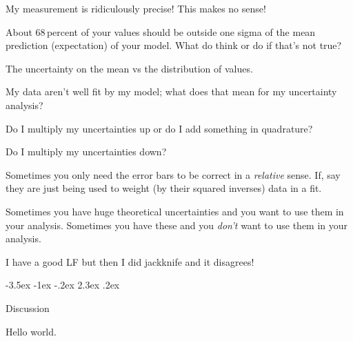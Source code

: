 \documentclass[10pt]{article}
\makeatletter
\renewcommand\section{\@startsection {section}{1}{\z@}%
  {-3.5ex \@plus -1ex \@minus -.2ex}%
  {2.3ex \@plus.2ex}%
  {\raggedright\normalfont\Large\bfseries}}
\makeatother
\begin{document}
My measurement is ridiculously precise! This makes no sense!

About 68\,percent of your values should be outside one sigma of the
mean prediction (expectation) of your model. What do think or do if
that's not true?

The uncertainty on the mean vs the distribution of values.

My data aren't well fit by my model; what does that mean for my uncertainty
analysis?

Do I multiply my uncertainties up or do I add something in quadrature?

Do I multiply my uncertainties down?

Sometimes you only need the error bars to be correct in a
\emph{relative} sense. If, say they are just being used to weight (by
their squared inverses) data in a fit.

Sometimes you have huge theoretical uncertainties and you want to use
them in your analysis. Sometimes you have these and you \emph{don't} want
to use them in your analysis.

I have a good LF but then I did jackknife and it disagrees!

\section{Discussion}

Hello world.

\clearpage\raggedright

\end{document}
